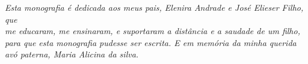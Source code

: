 \begin{dedicatoria}
   \vspace*{\fill}
   \centering
   \noindent

   \textit{Esta monografia é dedicada aos meus pais, Elenira Andrade e José Elieser Filho, que\\
   me educaram, me ensinaram, e suportaram a distância e a saudade de um filho, para que esta monografia pudesse ser escrita. E em memória da minha querida avó paterna, Maria Alicina da silva.} \vspace*{\fill}
\end{dedicatoria}

